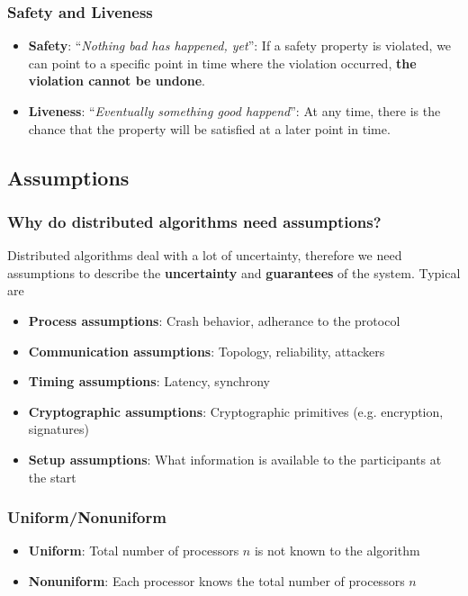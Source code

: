 \documentclass[12pt,A4]{extarticle}
\newcommand{\highlight}[1]{\textcolor{highlightColor}{\textbf{#1}}}
\begin{document}
\subsubsection{Safety and Liveness}
\begin{itemize}
  \item{\highlight{Safety}: ``\textit{Nothing bad has happened, yet}'': If a safety property is violated, we can point to a specific point in time where the violation occurred, \textbf{the violation cannot be undone}.}
  \item{\highlight{Liveness}: ``\textit{Eventually something good happend}'': At any time, there is the chance that the property will be satisfied at a later point in time.}
\end{itemize}

\subsection{Assumptions}
\subsubsection{Why do distributed algorithms need assumptions?}
Distributed algorithms deal with a lot of uncertainty, therefore we need assumptions to describe the \textbf{uncertainty} and \textbf{guarantees} of the system. Typical are
\begin{itemize}
  \item{\textbf{Process assumptions}: Crash behavior, adherance to the protocol}
  \item{\textbf{Communication assumptions}: Topology, reliability, attackers}
  \item{\textbf{Timing assumptions}: Latency, synchrony}
  \item{\textbf{Cryptographic assumptions}: Cryptographic primitives (e.g. encryption, signatures)}
  \item{\textbf{Setup assumptions}: What information is available to the participants at the start}
\end{itemize}

\subsubsection{Uniform/Nonuniform}
\begin{itemize}
  \item{\textbf{Uniform}: Total number of processors $n$ is not known to the algorithm}
  \item{\textbf{Nonuniform}: Each processor knows the total number of processors $n$}
\end{itemize}
\end{document}
